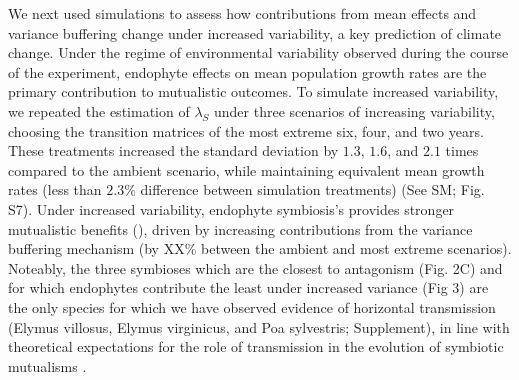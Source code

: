 \documentclass[12pt]{article}
\begin{document}
We next used simulations to assess how contributions from mean effects and variance buffering change under increased variability, a key prediction of climate change.
Under the regime of environmental variability observed during the course of the experiment, endophyte effects on mean population growth rates are the primary contribution to mutualistic outcomes. 
To simulate increased variability, we repeated the estimation of $\lambda_{S}$ under three scenarios of increasing variability, choosing the transition matrices of the most extreme six, four, and two years. 
These treatments increased the standard deviation by $1.3$, $1.6$, and $2.1$ times compared to the ambient scenario, while maintaining equivalent mean growth rates (less than $2.3\%$ difference between simulation treatments)   (See SM; Fig. S7).
Under increased variability, endophyte symbiosis's provides stronger mutualistic benefits (), driven by increasing contributions from the variance buffering mechanism (by XX\% between the ambient and most extreme scenarios).
Noteably, the three symbioses which are the closest to antagonism (Fig. 2C) and for which endophytes contribute the least under increased variance (Fig 3) are the only species for which we have observed evidence of horizontal transmission (Elymus villosus, Elymus virginicus, and Poa sylvestris; Supplement), in line with theoretical expectations for the role of transmission in the evolution of symbiotic mutualisms \cite{fine1975vectors,afkhami2008symbiosis}.
\end{document}
